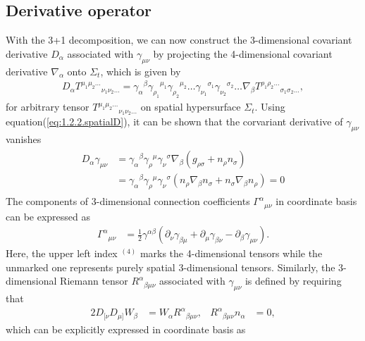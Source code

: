 \subsection{Derivative operator} \label{section1.2.2}
With the 3+1 decomposition, we can now construct the 3-dimensional covariant derivative $D_\alpha$ associated with $\gamma_{\mu\nu}$ by projecting the 4-dimensional covariant derivative $\nabla_\alpha$ onto $\Sigma_t$, which is given by
\begin{align}\label{eq:1.2.2.spatialD}
    D_{\alpha} T^{\mu_1 \mu_2 \dots}{}_{\nu_1 \nu_2 \dots} = \gamma_{\alpha}{}^{\beta}\gamma_{\rho_1}{}^{\mu_1} \gamma_{\rho_2}{}^{\mu_2} \dots \gamma_{\nu_1}{}^{\sigma_1} \gamma_{\nu_2}{}^{\sigma_2} \dots \nabla_{\beta} T^{\rho_1 \rho_2 \dots}{}_{\sigma_1 \sigma_2 \dots},
\end{align}
for arbitrary tensor $T^{\mu_1 \mu_2 \dots}{}_{\nu_1 \nu_2 \dots}$ on spatial hypersurface $\Sigma_t$.
Using equation(\ref{eq:1.2.2.spatialD}), it can be shown that the corvariant derivative of $\gamma_{\mu\nu}$ vanishes
\begin{align}
\begin{split}
    D_{\alpha} \gamma_{\mu\nu} &= \gamma_{\alpha}{}^{\beta} \gamma_{\rho}{}^{\mu} \gamma_{\nu}{}^{\sigma} \nabla_{\beta} \left(g_{\rho\sigma} + n_\rho n_\sigma \right) \\
    &= \gamma_{\alpha}{}^{\beta} \gamma_{\rho}{}^{\mu} \gamma_{\nu}{}^{\sigma} \left( n_\rho \nabla_\beta n_\sigma + n_\sigma \nabla_\beta n_\rho \right) = 0
\end{split}
\end{align}
The components of 3-dimensional connection coefficients $\Gamma^{\alpha}{}_{\mu\nu}$ in coordinate basis can be expressed as
\begin{align}\label{eq:3_connection}
    \Gamma^{\alpha}{}_{\mu\nu} &= \frac{1}{2} \gamma^{\alpha\beta} \left( \partial_{\nu}\gamma_{\beta\mu} + \partial_{\mu}\gamma_{\beta\nu} - \partial_{\beta}\gamma_{\mu\nu} \right).
\end{align}
Here, the upper left index ${}^{(4)}$ marks the 4-dimensional tensors while the unmarked one represents purely spatial 3-dimensional tensors.
Similarly, the 3-dimensional Riemann tensor $R^{\alpha}{}_{\beta\mu\nu}$ associated with $\gamma_{\mu\nu}$ is defined by requiring that
\begin{align}
    2 D_{[\nu} D_{\mu]} W_\beta &= W_\alpha R^\alpha{}_{\beta\mu\nu}, & R^{\alpha}{}_{\beta\mu\nu} n_\alpha &= 0,
\end{align}
which can be explicitly expressed in coordinate basis as
